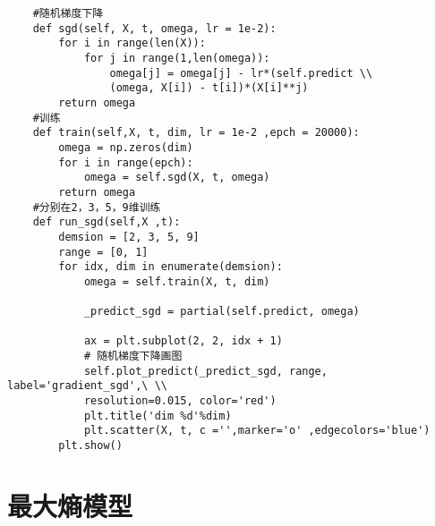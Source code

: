 \documentclass{ctexart}
\begin{document}
    \begin{lstlisting}
    #随机梯度下降
    def sgd(self, X, t, omega, lr = 1e-2):
        for i in range(len(X)):
            for j in range(1,len(omega)):
                omega[j] = omega[j] - lr*(self.predict \\
                (omega, X[i]) - t[i])*(X[i]**j)
        return omega
    #训练
    def train(self,X, t, dim, lr = 1e-2 ,epch = 20000):
        omega = np.zeros(dim)
        for i in range(epch):
            omega = self.sgd(X, t, omega)
        return omega
    #分别在2，3，5，9维训练
    def run_sgd(self,X ,t):
        demsion = [2, 3, 5, 9]
        range = [0, 1]
        for idx, dim in enumerate(demsion):
            omega = self.train(X, t, dim)

            _predict_sgd = partial(self.predict, omega)

            ax = plt.subplot(2, 2, idx + 1)
            # 随机梯度下降画图
            self.plot_predict(_predict_sgd, range, label='gradient_sgd',\ \\ 
            resolution=0.015, color='red')
            plt.title('dim %d'%dim)
            plt.scatter(X, t, c ='',marker='o' ,edgecolors='blue')
        plt.show()
    \end{lstlisting}
    
    \section{最大熵模型}
\end{document}
